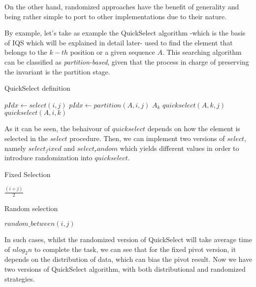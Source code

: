 \documentclass{iccmemoria}
\begin{document}
On the other hand, randomized approaches have the benefit of generality and being rather simple to port to other implementations due to their nature.

By example, let's take as example the QuickSelect algorithm -which is the basis of IQS which will be explained in detail later- used to find the element that belongs to the $k-th$ position or a given sequence $A$. This searching algorithm can be classified as \textit{partition-based}, given that the process in charge of preserving the invariant is the partition stage.


\begin{algorithm}
  \caption{QuickSelect definition}\label{ALG:QuickSelect}
  \begin{algorithmic}[1]
    \State $pIdx \gets select(i,j)$
    \State $pIdx \gets partition(A,i,j)$
     \Return $A_k$
    \EndIf
     \Return $quickselect(A, k, j)$
    \EndIf
     \Return $quickselect(A, i, k)$
    \EndIf
    \EndProcedure
  \end{algorithmic}
\end{algorithm}

As it can be seen, the behaivour of $quickselect$ depends on how the element is selected in the $select$ procedure. Then, we can implement two versions of $select$, namely $select_fixed$ and $select_random$ which yields different values in order to introduce randomization into $quickselect$.

\begin{algorithm}
  \caption{Fixed Selection}\label{ALG:Select_fixed}
  \begin{algorithmic}[1]
    \State \Return $\frac{(i+j)}{2}$
    \EndProcedure
  \end{algorithmic}
\end{algorithm}

\begin{algorithm}
  \caption{Random selection}\label{ALG:Select_random}
  \begin{algorithmic}[1]
    \State \Return $random\_between(i,j)$
    \EndProcedure
  \end{algorithmic}
\end{algorithm}

In such cases, whilst the randomized version of QuickSelect will take average time of $nlog_2n$ to complete the task, we can see that for the fixed pivot version, it depends on the distribution of data, which can bias the pivot result. Now we have two versions of QuickSelect algorithm, with both distributional and randomized strategies.
\end{document}
